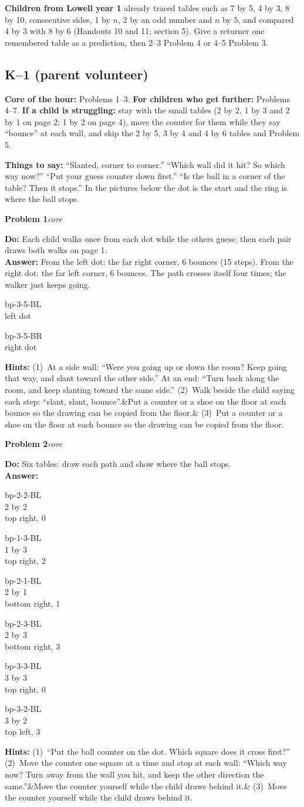 \documentclass[11pt,letterpaper]{article}
\newcommand{\bp}[3]{\csname bp-#1-#2-#3\endcsname}
\newcommand{\thumb}[5]{\begin{minipage}[b]{#4}\centering\bp{#1}{#2}{#3}\\[2pt]{\footnotesize #5}\end{minipage}}
\newcommand{\prob}[3]{\needspace{3\baselineskip}\par\smallskip\textbf{#1}\enspace\textit{#2}\enspace{\small(#3)}\par}
\newcommand{\what}{\textbf{Do:} }
\newcommand{\ans}{\textbf{Answer:} }
\newcommand{\hints}[3]{\textbf{Hints:} (1)~#1 (2)~#2\ifx&#3&\else{} (3)~#3\fi\par}
\newcommand{\core}{core}
\begin{document}
\textbf{Children from Lowell year 1} already traced tables such as 7 by 5, 4 by 3, 8 by 10, consecutive sides, 1 by $n$, 2 by an odd number and $n$ by 5, and compared 4 by 3 with 8 by 6 (Handouts 10 and 11; section 5). Give a returner one remembered table as a prediction, then 2--3 Problem 4 or 4--5 Problem 3.

\subsection{K--1 (parent volunteer)}
\textbf{Core of the hour:} Problems 1--3. \textbf{For children who get further:} Problems 4--7. \textbf{If a child is struggling:} stay with the small tables (2 by 2, 1 by 3 and 2 by 1 on page 2; 1 by 2 on page 4), move the counter for them while they say ``bounce'' at each wall, and skip the 2 by 5, 3 by 4 and 4 by 6 tables and Problem 5.

\textbf{Things to say:} ``Slanted, corner to corner.'' ``Which wall did it hit? So which way now?'' ``Put your guess counter down first.'' ``Is the ball in a corner of the table? Then it stops.'' In the pictures below the dot is the start and the ring is where the ball stops.

\prob{Problem 1}{\core}{page 1, floor grid}
\what Each child walks once from each dot while the others guess; then each pair draws both walks on page 1.\\
\ans From the left dot: the far right corner, 6 bounces (15 steps). From the right dot: the far left corner, 6 bounces. The path crosses itself four times; the walker just keeps going.

\thumb{3}{5}{BL}{0.9in}{left dot}\hspace{0.3in}\thumb{3}{5}{BR}{0.9in}{right dot}

\hints{At a side wall: ``Were you going up or down the room? Keep going that way, and slant toward the other side.'' At an end: ``Turn back along the room, and keep slanting toward the same side.''}{Walk beside the child saying each step: ``slant, slant, bounce''.}{Put a counter or a shoe on the floor at each bounce so the drawing can be copied from the floor.}

\prob{Problem 2}{\core}{page 2}
\what Six tables: draw each path and show where the ball stops.\\
\ans\par\nopagebreak
\thumb{2}{2}{BL}{0.95in}{2 by 2\\top right, 0}\hfill
\thumb{1}{3}{BL}{0.95in}{1 by 3\\top right, 2}\hfill
\thumb{2}{1}{BL}{0.95in}{2 by 1\\bottom right, 1}\hfill
\thumb{2}{3}{BL}{0.95in}{2 by 3\\bottom right, 3}\hfill
\thumb{3}{3}{BL}{0.95in}{3 by 3\\top right, 0}\hfill
\thumb{3}{2}{BL}{0.95in}{3 by 2\\top left, 3}\par
\hints{``Put the ball counter on the dot. Which square does it cross first?''}{Move the counter one square at a time and stop at each wall: ``Which way now? Turn away from the wall you hit, and keep the other direction the same.''}{Move the counter yourself while the child draws behind it.}
\end{document}
